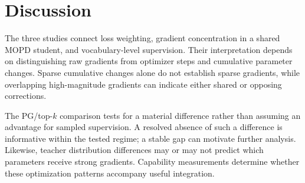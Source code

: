 \section{Discussion}
\label{sec:conclusion}

The three studies connect loss weighting, gradient concentration in a
shared MOPD student, and vocabulary-level supervision. Their interpretation
depends on distinguishing raw gradients from optimizer steps and
cumulative parameter changes. Sparse cumulative changes alone do not
establish sparse gradients, while overlapping high-magnitude gradients
can indicate either shared or opposing corrections.

The PG/top-$k$ comparison tests for a material difference rather than
assuming an advantage for sampled supervision. A resolved absence of
such a difference is informative within the tested regime; a stable
gap can motivate further analysis. Likewise, teacher distribution
differences may or may not predict which parameters receive strong
gradients. Capability measurements determine whether these optimization
patterns accompany useful integration.

